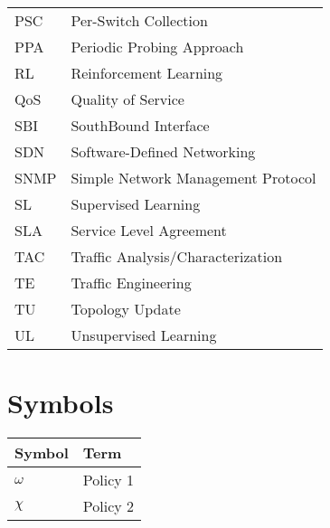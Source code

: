 \begin{longtable}[l]{>{}l<{}l}
PSC     &   Per-Switch Collection\\
PPA		&	Periodic Probing Approach\\
RL      &   Reinforcement Learning\\
QoS     &   Quality of Service\\
SBI     &   SouthBound Interface \\
SDN     &   Software-Defined Networking\\
SNMP    &   Simple Network Management Protocol\\
SL      &   Supervised Learning\\
SLA     &   Service Level Agreement\\
TAC     &   Traffic Analysis/Characterization\\
TE      &   Traffic Engineering\\
TU      &   Topology Update\\
UL      &   Unsupervised Learning\\
\end{longtable}

\section*{Symbols}
\begin{longtable}[l]{>{}l<{}l}
  \textbf{Symbol} & \textbf{Term} \\[0.5ex] \hline%
  \endfirsthead%
\renewcommand{\arraystretch}{1.4}\label{simbolosg}%
$\omega$    &   Policy 1\\
$\chi$      &   Policy 2\\

\end{longtable}